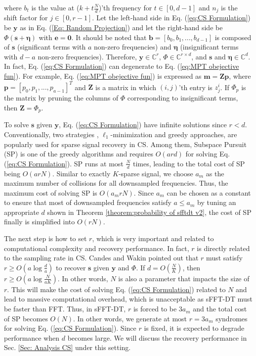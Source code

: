 \documentclass[journal,onecolumn,11pt]{IEEEtran}
\begin{document}
\normalsize
where $b_{t}$ is the value at ($k+t\frac{N}{d}$)'th frequency for $t \in [0,d-1]$ and $n_{j}$ is the shift factor for $j \in [0,r-1]$.
Let the left-hand side in Eq. (\ref{eq:CS Formulation}) be $\bm{y}$ as in Eq. (\ref{Eq: Random Projection}) and let the right-hand side be $\Phi (\bm{s}+\bm{\eta})$ with $\bm{e}=\bm{0}$.
It should be noted that $\bm{b} = [b_{0},b_{1},...,b_{d-1}]$ is composed of $\bm{s}$ (significant terms with $a$ non-zero frequencies) and $\bm{\eta}$ (insignificant terms with $d-a$ non-zero frequencies).
Therefore, $\bm{y} \in \mathbb{C}^{r}$, $\Phi \in \mathbb{C}^{r \times d}$, and $\bm{s}$ and $\bm{\eta} \in \mathbb{C}^{d}$.
In fact, Eq. (\ref{eq:CS Formulation}) can degenerate to Eq. (\ref{eq:MPT obejective fun}).
For example, Eq. (\ref{eq:MPT obejective fun}) is expressed as $\bm{m}=\bm{Z}\bm{p}$, where $\bm{p}=[p_{0},p_{1},...,p_{a-1} ]^{T}$ and $\bm{Z}$ is a matrix in which $(i,j)$'th entry is $z^{i}_{j}$.
If $\Phi_{p}$ is the matrix by pruning the columns of $\Phi$ corresponding to insignificant terms, then $\bm{Z}=\Phi_{p}$.

To solve $\bm{s}$ given $\bm{y}$, Eq. (\ref{eq:CS Formulation}) have infinite solutions since $r < d$.
Conventionally, two strategies \cite{Donoho2006}, $\ell_{1}$-minimization and greedy approaches, are popularly used for sparse signal recovery in CS.
Among them, Subspace Pursuit (SP) \cite{Dai2009} is one of the greedy algorithms and requires $O(ard)$ for solving Eq. (\ref{eq:CS Formulation}).
SP runs at most $\frac{N}{d}$ times, leading to the total cost of SP being $O(arN)$.
Similar to exactly $K$-sparse signal, we choose $a_{m}$ as the maximum number of collisions for all downsampled frequencies. Thus, the maximum cost of solving SP is $O(a_{m}rN)$.
Since $a_{m}$ can be chosen as a constant to ensure that most of downsampled frequencies satisfy $a \leq a_{m}$ by tuning an appropriate $d$ shown in Theorem \ref{theorem:probability of sfftdt v2}, the cost of SP finally is simplified into $O(rN)$.

The next step is how to set $r$, which is very important and related to computational complexity and recovery performance.
In fact, $r$ is directly related to the sampling rate in CS.
Candes and Wakin \cite{Candes2008} pointed out that $r$  must satisfy $r \geq O(a \log   \frac{d}{a})$ to recover $\bm{s}$ given $\bm{y}$ and $\Phi$.
If $  d=O(\frac{N}{K})$, then $r \geq O(a \log \frac{N}{aK})$.
In other words, $N$ is also a parameter that impacts the size of $r$.
This will make the cost of solving Eq. (\ref{eq:CS Formulation}) related to $N$ and lead to massive computational overhead, which is unacceptable as sFFT-DT must be faster than FFT.
Thus, in sFFT-DT, $r$ is forced to be $3a_{m}$ and the total cost of SP becomes $O(N)$.
In other words, we generate at most $r=3a_{m}$ syndromes for solving Eq. (\ref{eq:CS Formulation}).
Since $r$ is fixed, it is expected to degrade performance when $d$ becomes large.
We will discuss the recovery performance in Sec. \ref{Sec: Analysis CS} under this setting.
\end{document}
